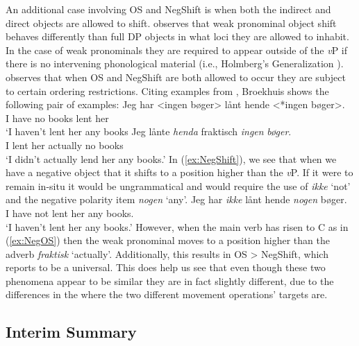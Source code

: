 \documentclass[12pt, letterpaper]{article}
\begin{document}
An additional case involving OS and NegShift is when both the indirect and direct objects are allowed to shift. \citet[417f]{broekhuisUnificationObjectShift2020} observes that weak pronominal object shift behaves differently than full DP objects in what loci they are allowed to inhabit. In the case of weak pronominals they are required to appear outside of the \textit{v}P if there is no intervening phonological material (i.e., Holmberg's Generalization \cite{holmbergWordOrderSyntactic1986,holmbergRemarksHolmbergGeneralization1999}). \citeauthor{broekhuisUnificationObjectShift2020} observes that when OS and NegShift are both allowed to occur they are subject to certain ordering restrictions. Citing examples from \citet[163ff]{christensenInterfacesNegationSyntax2005}, Broekhuis shows the following pair of examples:
	\ea 
		\ea \label{ex:NegShift}
		\gll Jeg har <ingen bøger> lånt hende <*ingen bøger>.\\
		I have no books lent her\\
		\glt `I haven't lent her any books
		\ex \label{ex:NegOS}
		\gll Jeg lånte \textit{henda} fraktisch \textit{ingen} \textit{bøger}.\\
		I lent her actually no books\\
		\glt `I didn't actually lend her any books.'
		\z 
	\z
In (\ref{ex:NegShift}), we see that when we have a negative object that it shifts to a position higher than the \textit{v}P. If it were to remain in-situ it would be ungrammatical and would require the use of \textit{ikke} `not' and the negative polarity item \textit{nogen} `any'.
	\ea
	\gll Jeg har \textit{ikke} lånt hende \textit{nogen} bøger.\\
	I have not lent her any books.\\
	\glt `I haven't lent her any books.'
	\z
However, when the main verb has risen to C as in (\ref{ex:NegOS}) then the weak pronominal moves to a position higher than the adverb \textit{fraktisk} `actually'. Additionally, this results in OS > NegShift, which \citeauthor{broekhuisUnificationObjectShift2020} reports to be a universal. This does help us see that even though these two phenomena appear to be similar they are in fact slightly different, due to the differences in the where the two different movement operations' targets are.

\subsection{Interim Summary} \label{sec:SUMMARY}
\end{document}
